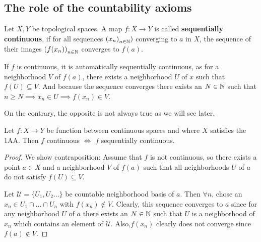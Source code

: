 
\subsection{The role of the countability axioms}

\begin{dfn}[]
  Let $X,Y$ be topological spaces. A map $f: X \to  Y$ is called \textbf{sequentially continuous}, if for all sequences $\left(x_{n}\right)_{n \in \mathbb{N}})$ converging to $a$ in $X$, the sequence of their images $\left(f(x_{n})\right)_{n \in \mathbb{N}}$ converges to $f(a)$.
\end{dfn}
If $f$ is continuous, it is automatically sequentially continuous, as for a neighborhood $V$ of $f(a)$, there exists a neighborhood $U$ of $x$ such that $f(U) \subseteq V$.
And because the sequence converges
there exists an $N \in \mathbb{N}$ such that $n \geq N \implies x_n \in U \implies f(x_n) \in V$.

On the contrary, the opposite is not always true as we will see later.

\begin{lem}[]
Let $f: X \to  Y$ be function between continuous spaces and where $X$ satisfies the 1AA. Then
$f$ continuous $\iff$ $f$ sequentially continuous.
\end{lem}
\begin{proof}
We show contraposition:
Assume that $f$ is not continuous, so there exists a point $a \in X$ and a neighborhood $V$ of $f(a)$ such that all neighborhoods $U$ of $a$ do not satisfy $f(U) \subseteq V$.

Let $\mathcal{U} = \{U_1,U_2\ldots\}$ be countable neighborhood basis of $a$.
Then $\forall n$, chose an $x_n \in U_1 \cap \ldots \cap U_n$ with $f(x_n) \notin V$.
Clearly, this sequence converges to $a$ since for any neighborhood $U$ of $a$ there exists an $N \in \mathbb{N}$ such that $U$ is a neighborhood of $x_n$ which contains an element of $\mathcal{U}$.
Also,$f(x_n)$ clearly does not converge since $f(a) \notin V$.
\end{proof}



